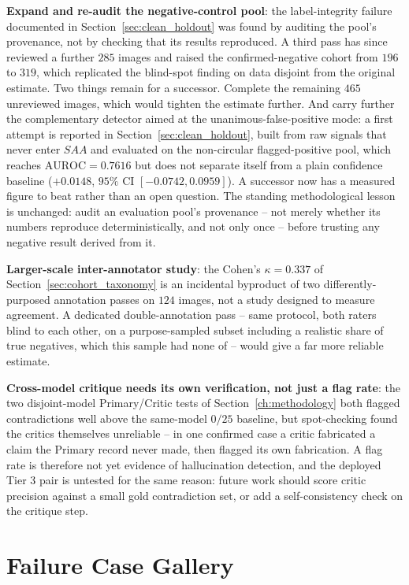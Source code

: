 \documentclass[12pt,a4paper]{report}
\begin{document}
\textbf{Expand and re-audit the negative-control pool}: the label-integrity failure documented in Section~\ref{sec:clean_holdout} was found by auditing the pool's provenance, not by checking that its results reproduced. A third pass has since reviewed a further $285$ images and raised the confirmed-negative cohort from $196$ to $319$, which replicated the blind-spot finding on data disjoint from the original estimate. Two things remain for a successor. Complete the remaining $465$ unreviewed images, which would tighten the estimate further. And carry further the complementary detector aimed at the unanimous-false-positive mode: a first attempt is reported in Section~\ref{sec:clean_holdout}, built from raw signals that never enter $SAA$ and evaluated on the non-circular flagged-positive pool, which reaches $\text{AUROC}=0.7616$ but does not separate itself from a plain confidence baseline ($+0.0148$, $95\%$ CI $[-0.0742, 0.0959]$). A successor now has a measured figure to beat rather than an open question. The standing methodological lesson is unchanged: audit an evaluation pool's provenance -- not merely whether its numbers reproduce deterministically, and not only once -- before trusting any negative result derived from it.

\textbf{Larger-scale inter-annotator study}: the Cohen's $\kappa=0.337$ of Section~\ref{sec:cohort_taxonomy} is an incidental byproduct of two differently-purposed annotation passes on $124$ images, not a study designed to measure agreement. A dedicated double-annotation pass -- same protocol, both raters blind to each other, on a purpose-sampled subset including a realistic share of true negatives, which this sample had none of -- would give a far more reliable estimate.

\textbf{Cross-model critique needs its own verification, not just a flag rate}: the two disjoint-model Primary/Critic tests of Section~\ref{ch:methodology} both flagged contradictions well above the same-model $0/25$ baseline, but spot-checking found the critics themselves unreliable -- in one confirmed case a critic fabricated a claim the Primary record never made, then flagged its own fabrication. A flag rate is therefore not yet evidence of hallucination detection, and the deployed Tier 3 pair is untested for the same reason: future work should score critic precision against a small gold contradiction set, or add a self-consistency check on the critique step.

\appendix
\chapter{Failure Case Gallery}

\end{document}
